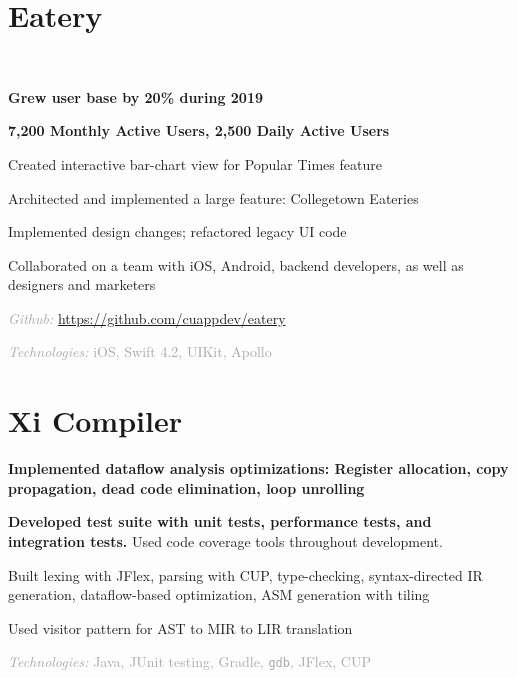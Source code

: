 \documentclass[]{deedy-resume-openfont}
\newcommand{\myurl}[1]{
	\urlstyle{same}\url{#1}
}
\let\sectionold\section
\renewcommand{\section}[1]{
	\sectionold{\textcolor{sectiontitlecolor}{#1}}
}
\begin{document}
\begin{minipage}[t]{0.66\textwidth}
\section{Eatery}
 \\
\begin{tightemize}
\item \textbf{Grew user base by 20\% during 2019}
\item \textbf{7,200 Monthly Active Users, 2,500 Daily Active Users} 
\item Created interactive bar-chart view for Popular Times feature
\item Architected and implemented a large feature: Collegetown Eateries
\item Implemented design changes; refactored legacy UI code
\item Collaborated on a team with iOS, Android, backend developers, as well as designers and marketers
\item \textcolor{darkgray}{\textit{Github:} \myurl{https://github.com/cuappdev/eatery}}  \\
\item \textcolor{darkgray}{\textit{Technologies:} iOS, Swift 4.2, UIKit, Apollo} 
\end{tightemize}

\section{Xi Compiler}
\begin{tightemize}
\item \textbf{Implemented dataflow analysis optimizations: Register allocation, copy propagation, dead code elimination, loop unrolling}
\item \textbf{Developed test suite with unit tests, performance tests, and integration tests.} Used code coverage tools throughout development.
\item Built lexing with JFlex, parsing with CUP, type-checking, syntax-directed IR generation, dataflow-based optimization, ASM generation with tiling
\item Used visitor pattern for AST to MIR to LIR translation
\item \textcolor{darkgray}{\textit{Technologies:} Java, JUnit testing, Gradle, \texttt{gdb}, JFlex, CUP}
\end{tightemize}


\end{minipage}
\end{document}
